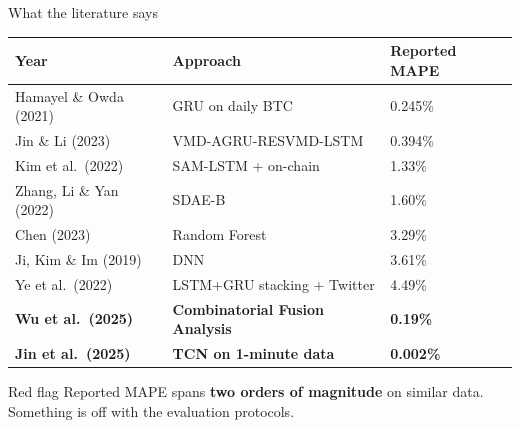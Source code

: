 \documentclass[aspectratio=169]{beamer}
\begin{document}
\begin{frame}{What the literature says}
\footnotesize
\begin{table}
\renewcommand{\arraystretch}{1.1}
\begin{tabular}{lll}
\toprule
\textbf{Year} & \textbf{Approach} & \textbf{Reported MAPE} \\
\midrule
Hamayel \& Owda (2021) & GRU on daily BTC                    & 0.245\% \\
Jin \& Li (2023)       & VMD-AGRU-RESVMD-LSTM                & 0.394\% \\
Kim et al.\ (2022)     & SAM-LSTM + on-chain                 & 1.33\% \\
Zhang, Li \& Yan (2022)& SDAE-B                              & 1.60\% \\
Chen (2023)            & Random Forest                       & 3.29\% \\
Ji, Kim \& Im (2019)   & DNN                                 & 3.61\% \\
Ye et al.\ (2022)      & LSTM+GRU stacking + Twitter         & 4.49\% \\
\rowcolor{accentblue!15}
\textbf{Wu et al.\ (2025)} & \textbf{Combinatorial Fusion Analysis} & \textbf{0.19\%} \\
\rowcolor{accentgreen!15}
\textbf{Jin et al.\ (2025)} & \textbf{TCN on 1-minute data}     & \textbf{0.002\%} \\
\bottomrule
\end{tabular}
\end{table}

\vspace{0.2cm}
\begin{alertblock}{Red flag}
Reported MAPE spans \textbf{two orders of magnitude} on similar data. Something is off with the evaluation protocols.
\end{alertblock}
\end{frame}
\end{document}
